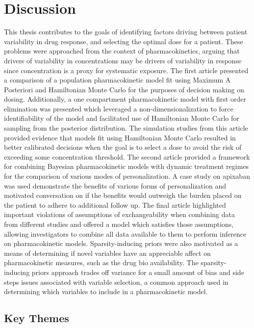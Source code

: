 \chapter{Discussion}

This thesis contributes to the goals of identifying factors driving between patient variability in drug response, and selecting the optimal dose for a patient.  These problems were approached from the context of pharmacokinetics, arguing that drivers of variability in concentrations may be drivers of variability in response since concentration is a proxy for systematic exposure.  The first article presented a comparison of a population pharmacokinetic model fit using Maximum A Posteriori and Hamiltonian Monte Carlo for the purposes of decision making on dosing.  Additionally, a one compartment pharmacokinetic model with first order elimination was presented which leveraged a non-dimensionalization to force identifiability of the model and facilitated use of Hamiltonian Monte Carlo for sampling from the posterior distribution. The simulation studies from this article provided evidence that models fit using Hamiltonian Monte Carlo resulted in better calibrated decisions when the goal is to select a dose to avoid the risk of exceeding some concentration threshold.  The second article provided a framework for combining Bayesian pharmacokinetic models with dynamic treatment regimes for the comparison of various modes of personalization.  A case study on apixaban was used demonstrate the benefits of various forms of personalization and motivated conversation on if the benefits would outweigh the burden placed on the patient to adhere to additional follow up. The final article highlighted important violations of assumptions of exchangeability when combining data from different studies and offered a model which satisfies those assumptions, allowing investigators to combine all data available to them to perform inference on pharmacokinetic models. Sparsity-inducing priors were also motivated as a means of determining if novel variables have an appreciable affect on pharmacokinetic measures, such as the drug bio availability. The sparsity-inducing priors approach trades off variance for a small amount of bias and side steps issues associated with variable selection, a common approach used in determining which variables to include in a pharmacokinetic model.

\section{Key Themes}


